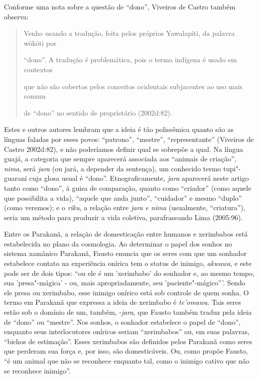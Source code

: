 Conforme uma nota sobre a questão de ``dono'', Viveiros de Castro também
observa:

\begin{quote}
Venho usando a tradução, feita pelos próprios Yawalapíti, da palavra
wököti por

``dono''. A tradução é problemática, pois o termo indígena é usado em
contextos

que não são cobertos pelos conceitos ocidentais subjacentes ao uso mais
comum

de ``dono'' no sentido de proprietário (2002d:82).
\end{quote}

Estes e outros autores lembram que a ideia é tão polissêmica quanto são
as línguas faladas por esses povos: ``patrono'', ``mestre'', ``representante''
(Viveiros de Castro 2002d:82), e não poderíamos definir qual se sobrepõe
a qual. Na língua guajá, a categoria que sempre aparecerá associada aos
``animais de criação'', \emph{nima}, será \emph{jara} (ou jará, a depender
da sentença), um conhecido termo tupi"-guarani cuja glosa usual é ``dono''.
Etnograficamente, \emph{jara} aparecerá neste artigo tanto como ``dono'',
à guisa de comparação, quanto como ``criador'' (como aquele que
possibilita a vida), ``aquele que anda junto'', ``cuidador'' e mesmo ``duplo''
(como veremos); e o \emph{riku}, a relação entre \emph{jara e nima}
(usualmente, ``criatura''), seria um método para produzir a vida
coletiva, parafraseando Lima (2005:96).

Entre os Parakanã, a relação de domesticação entre humanos e xerimbabos
está estabelecida no plano da cosmologia. Ao determinar o papel dos
sonhos no sistema xamânico Parakanã, Fausto enuncia que os seres com que
um sonhador estabelece contato na experiência onírica tem o status de
inimigo, \emph{akwawa}, e este pode ser de dois tipos: ``ou ele é um
'xerimbabo' do sonhador e, ao mesmo tempo, sua 'presa"-mágica' - ou, mais
apropriadamente, seu 'paciente"-mágico'''. Sendo ele presa ou xerimbabo,
esse inimigo onírico está sob controle de quem sonha. O termo em
Parakanã que expressa a ideia de xerimbabo é \emph{te'omawa}. Tais seres
estão sob o domínio de um, também, -\emph{jara}, que Fausto também
traduz pela ideia de ``dono'' ou ``mestre''. Nos sonhos, o sonhador
estabelece o papel de ``dono'', enquanto seus interlocutores oníricos
seriam ``xerimbabos'' ou, em suas palavras, ``bichos de estimação''. Esses
xerimbabos são definidos pelos Parakanã como seres que perderam sua
força e, por isso, são domesticáveis. Ou, como propõe Fausto, ``é um
animal que não se reconhece enquanto tal, como o inimigo cativo que não
se reconhece inimigo''.

